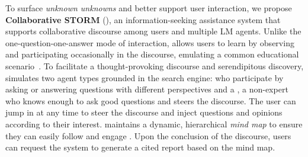 \documentclass[11pt]{article}
\begin{document}
To surface \textit{unknown unknowns} and better support user interaction, we propose \textbf{Collaborative STORM} (\textbf{\system}), an information-seeking assistance system that supports collaborative discourse among users and multiple LM agents. Unlike the one-question-one-answer mode of interaction, \system allows users to learn by observing and participating occasionally in the discourse, emulating a common educational scenario~\citep{nussbaum2008collaborative}. 
To facilitate a thought-provoking discourse and serendipitous discovery, \system simulates two agent types grounded in the search engine: \textit{\experts} who participate by asking or answering questions with different perspectives and a \textit{\moderator}, a non-expert who knows enough to ask good questions and steers the discourse. The user can jump in at any time to steer the discourse and inject questions and opinions according to their interest.  \system maintains a dynamic, hierarchical \textit{mind map} to ensure they can easily follow and engage \citep{buzan1974noting}. 
Upon the conclusion of the discourse, users can request the system to generate a cited report based on the mind map. 


\end{document}
